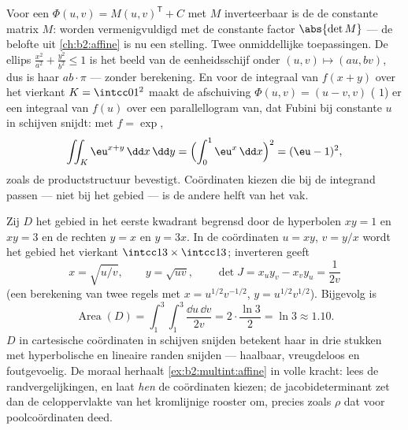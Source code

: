 \begin{example}\label{ex:b2:multint:affine}
Voor een  $\Phi(u, v) = M(u, v)^{\mathsf T} + C$
met $M$ inverteerbaar is de  de constante matrix $M$:
 worden vermenigvuldigd met de constante factor
$\abs{\det M}$ --- de belofte uit \cref{ch:b2:affine} is nu een
stelling. Twee onmiddellijke toepassingen. De ellips
$\frac{x^2}{a^2} + \frac{y^2}{b^2} \leq 1$ is het beeld van de
eenheidsschijf onder $(u, v) \mapsto (au, bv)$, dus is haar
 $ab \cdot \pi$ --- zonder berekening. En voor de
integraal van $f(x + y)$ over het vierkant $K = \intcc01^2$ maakt
de afschuiving $\Phi(u, v) = (u - v, v)$ ( $1$) er een
integraal van $f(u)$ over een parallellogram van, dat Fubini bij
constante $u$ in schijven snijdt: met $f = \exp$,
\[
\iint_K \eu^{x+y}\,\dd x\,\dd y
= \Bigl(\int_0^1 \eu^x\,\dd x\Bigr)^2 = (\eu - 1)^2,
\]
zoals de productstructuur bevestigt. Coördinaten kiezen die bij de
integrand passen --- niet bij het gebied --- is de andere helft van
het vak.
\end{example}


\begin{example}\label{ex:b2:multint:hyperbolicregion}
Zij $D$ het gebied in het eerste kwadrant begrensd door de
hyperbolen $xy = 1$ en $xy = 3$ en de rechten $y = x$ en $y = 3x$.
In de coördinaten $u = xy$, $v = y/x$ wordt het gebied het vierkant
$\intcc13 \times \intcc13$; inverteren geeft
\[
x = \sqrt{u/v}, \qquad y = \sqrt{uv},
\qquad
\det J = x_uy_v - x_vy_u = \frac{1}{2v}
\]
(een berekening van twee regels met $x = u^{1/2}v^{-1/2}$, $y =
u^{1/2}v^{1/2}$). Bijgevolg is
\[
\operatorname{Area}(D)
= \int_1^3\!\!\int_1^3\frac{\dd u\,\dd v}{2v}
= 2\cdot\frac{\ln 3}{2} = \ln 3 \approx 1.10 .
\]
$D$ in cartesische coördinaten in schijven snijden betekent haar in
drie stukken met hyperbolische en lineaire randen snijden ---
haalbaar, vreugdeloos en foutgevoelig. De moraal herhaalt
\cref{ex:b2:multint:affine} in volle kracht: lees de
randvergelijkingen, en laat \emph{hen} de coördinaten kiezen; de
jacobideterminant zet dan de celoppervlakte van het kromlijnige
rooster om, precies zoals $\rho$ dat voor poolcoördinaten deed.
\end{example}

